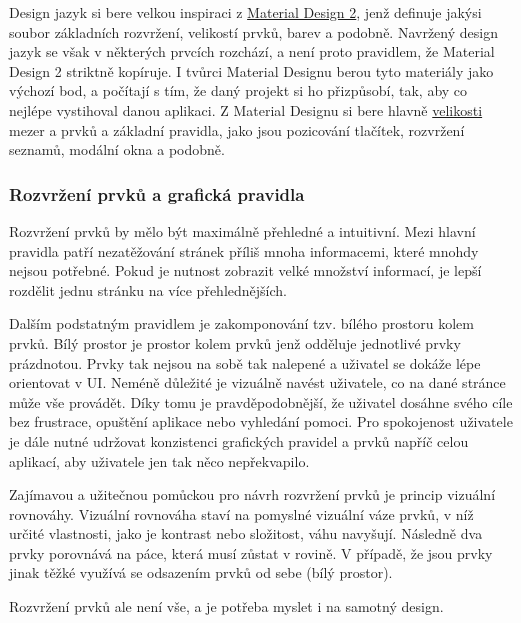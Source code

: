 	Design jazyk si bere velkou inspiraci z \href{https://material.io/}{Material Design 2}, jenž definuje jakýsi soubor
	základních rozvržení, velikostí prvků, barev a podobně.
	Navržený design jazyk se však v některých prvcích rozchází, a není proto pravidlem,
	že Material Design 2 striktně kopíruje.
	I tvůrci Material Designu berou tyto materiály jako výchozí bod, a počítají s tím, že daný projekt si ho přizpůsobí,
	tak, aby co nejlépe vystihoval danou aplikaci.
	Z Material Designu si bere hlavně \href{https://material.io/design/layout/spacing-methods.html#baseline-grid}{velikosti}
	mezer a prvků a základní pravidla, jako jsou pozicování tlačítek, rozvržení seznamů, modální okna a podobně.

		\subsubsection{Rozvržení prvků a grafická pravidla}

		Rozvržení prvků by mělo být maximálně přehledné a intuitivní.
		Mezi hlavní pravidla patří nezatěžování stránek příliš mnoha informacemi, které mnohdy nejsou potřebné.
		Pokud je nutnost zobrazit velké množství informací, je lepší rozdělit jednu stránku na více přehlednějších.

		Dalším podstatným pravidlem je zakomponování tzv. bílého prostoru kolem prvků.
		Bílý prostor je prostor kolem prvků jenž odděluje jednotlivé prvky prázdnotou.
		Prvky tak nejsou na sobě tak nalepené a uživatel se dokáže lépe orientovat v \ac{UI}.
		Neméně důležité je vizuálně navést uživatele, co na dané stránce může vše provádět.
		Díky tomu je pravděpodobnější, že uživatel dosáhne svého cíle bez frustrace, opuštění aplikace nebo vyhledání
		pomoci.
		Pro spokojenost uživatele je dále nutné udržovat konzistenci grafických pravidel a prvků
		napříč celou aplikací, aby uživatele jen tak něco nepřekvapilo. \cite{create_great_ux}

		Zajímavou a užitečnou pomůckou pro návrh rozvržení prvků je princip vizuální rovnováhy.
		Vizuální rovnováha staví na pomyslné vizuální váze prvků, v níž určité vlastnosti, jako je kontrast nebo složitost,
		váhu navyšují.
		Následně dva prvky porovnává na páce, která musí zůstat v rovině.
		V případě, že jsou prvky jinak těžké využívá se odsazením prvků od sebe (bílý prostor). \cite{vizualni_rovnovaha}


		Rozvržení prvků ale není vše, a je potřeba myslet i na samotný design.

